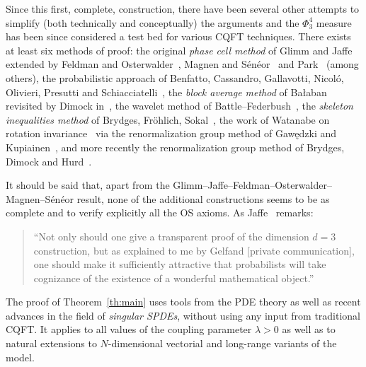 \documentclass[a4paper,11pt]{article}
\newcommand{\tmtextit}[1]{{\itshape{#1}}}
\numberwithin{equation}{section}
\begin{document}
\medskip

Since this first, complete, construction, there have been several other
attempts to simplify (both technically and conceptually) the arguments and
the $\Phi^4_3$ measure has been since considered a test bed for various CQFT
techniques. There exists at least six methods of  proof: the original \emph{phase
cell method} of Glimm and Jaffe extended by Feldman and
Osterwalder~{\cite{feldman_wightman_1976}}, Magnen and
S\'en\'eor~{\cite{magnen_infinite_1976}}  and Park~{\cite{park_convergence_1977}}
(among others), the probabilistic approach of Benfatto, Cassandro, Gallavotti,
Nicol{\'o}, Olivieri, Presutti and
Schiacciatelli~{\cite{benfatto_probabilistic_1978}}, the \emph{block average method}
of Ba{\l}aban~{\cite{MR733476}} revisited by Dimock
in~{\cite{dimock_renormalization_2013_1,dimock_renormalization_2013_2,dimock_renormalization_2014_3}},
the wavelet method of Battle--Federbush~{\cite{battle_wavelets_1999}}, the
\tmtextit{skeleton inequalities method} of Brydges, Fr{\"o}hlich,
Sokal~{\cite{MR723546}}, the work of Watanabe on rotation invariance~\cite{watanabe_block_1989} via the renormalization group method of Gaw\k{e}dzki and Kupiainen~\cite{gawpolhk_edzki_asymptotic_1986}, and more recently the {renormalization group method}
 of Brydges, Dimock and Hurd~{\cite{brydges_short_1995}}.

It should be said that, apart from the Glimm--Jaffe--Feldman--Osterwalder--Magnen--S\'en\'eor
result, none of the additional constructions seems to be as complete and to
verify explicitly all the OS axioms. As Jaffe~{\cite{MR2391806}} remarks:

\begin{quotation}
  ``Not only should one give a transparent proof of the dimension $d = 3$ 
  construction, but as explained to me by Gelfand [private communication], one
  should make it sufficiently attractive that probabilists will take
  cognizance of the existence of a wonderful mathematical object.''
\end{quotation}

%

\medskip
The proof of Theorem~\ref{th:main} uses tools from the PDE theory as
well as recent advances in the field of \tmtextit{singular SPDEs}, without using any input 
 from traditional CQFT.
It applies to all  values of the coupling parameter $\lambda>0$ as well as to natural
extensions to  $N$-dimensional vectorial and long-range variants of the model. 
 
\end{document}
